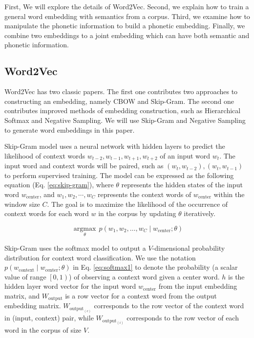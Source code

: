First, We will explore the details of Word2Vec. Second, we explain how to train a general word embedding with semantics from a corpus. Third, we examine how to manipulate the phonetic information to build a phonetic embedding. Finally, we combine two embeddings to a joint embedding which can have both semantic and phonetic information.

\subsection{Word2Vec} \label{sec:word2vec}

Word2Vec has two classic papers. The first one \cite{mikolov2013efficient} contributes two approaches to constructing an embedding, namely CBOW and Skip-Gram. The second one \cite{mikolov2013distributed} contributes improved methods of embedding construction, such as Hierarchical Softmax and Negative Sampling. We will use Skip-Gram and Negative Sampling to generate word embeddings in this paper.

Skip-Gram model uses a neural network with hidden layers to predict the likelihood of context words $w_{t-2}, w_{t-1}, w_{t+1}, w_{t+2}$ of an input word $w_t$. The input word and context words will be paired, such as $(w_t, w_{t-2}), (w_t, w_{t-1})$ to perform supervised training. The model can be expressed as the following equation (Eq. \ref{eq:skip-gram}), where $\theta$ represents the hidden states of the input word $w_\text{center}$, and $w_1, w_2, \cdots, w_C$ represents the context words of $w_\text{center}$ within the window size $C$. The goal is to maximize the likelihood of the occurrence of context words for each word $w$ in the corpus by updating $\theta$ iteratively.

\begin{equation}
\underset{\theta}{\operatorname{argmax}} \, p\left(w_{1}, w_{2}, \ldots, w_{C} \mid w_{\text {center}} ; \theta\right) \label{eq:skip-gram}
\end{equation}

Skip-Gram uses the softmax model to output a $V$-dimensional probability distribution for context word classification. We use the notation $p\left(w_{\text {context}} \mid w_{\text {center}}; \theta \right)$ in Eq. \ref{eq:softmax1} to denote the probability (a scalar value of range $\left[0, 1\right)$) of observing a context word given a center word. $h$ is the hidden layer word vector for the input word $w_\text{center}$ from the input embedding matrix, and $W_{\text {output}}$ is a row vector for a context word from the output embedding matrix. $W_{\text {output}_{(c)}}$ corresponds to the row vector of the context word in (input, context) pair, while $W_{\text {output}_{(i)}}$ corresponds to the row vector of each word in the corpus of size $V$.

